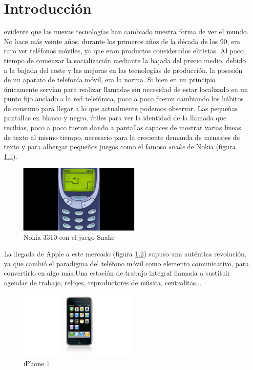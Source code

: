 \chapter{Introducción}


 evidente que las nuevas tecnologías han cambiado nuestra forma de ver el mundo. No hace más veinte años, durante los primeros años de la década de los 90, era raro ver teléfonos móviles, ya que eran productos considerados elitistas. Al poco tiempo de comenzar la socialización mediante la bajada del precio medio, debido a la bajada del coste y las mejoras en las tecnologías de producción, la posesión de un aparato de telefonía móvil, era la norma. Si bien en un principio únicamente servían para realizar llamadas sin necesidad de estar localizado en un punto fijo anclado a la red telefónica, poco a poco fueron cambiando los hábitos de consumo para llegar a lo que actualmente podemos observar. Las pequeñas pantallas en blanco y negro, útiles para ver la identidad de la llamada que recibías, poco a poco fueron dando a pantallas capaces de mostrar varias líneas de texto al mismo tiempo, necesario para la creciente demanda de mensajes de texto y para albergar pequeños juegos como el famoso \textit{snake} de Nokia (figura \ref{fig:Nokia_snake}). 

\begin{figure}[hbtp]
\centering
\includegraphics[width=60mm]{images/introduccion/Nokia_snake.jpg}
\caption{Nokia 3310 con el juego Snake}
\label{fig:Nokia_snake}
\end{figure}

La llegada de Apple a este mercado (figura \ref{fig:Iphone}) supuso una auténtica revolución, ya que cambió el paradigma del teléfono móvil como elemento comunicativo, para convertirlo en algo más.Una estación de trabajo integral llamada a sustituir agendas de trabajo, relojes, reproductores de música, centralitas...\\

\begin{figure}[hbtp]
\centering
\includegraphics[width=60mm]{images/introduccion/Iphone1.jpg}
\caption{iPhone 1}
\label{fig:Iphone}
\end{figure}


